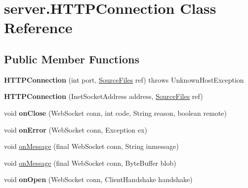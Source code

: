\hypertarget{classserver_1_1_h_t_t_p_connection}{
\section{server.HTTPConnection Class Reference}
\label{classserver_1_1_h_t_t_p_connection}
}
\subsection*{Public Member Functions}
\begin{DoxyCompactItemize}
\item 
\hypertarget{classserver_1_1_h_t_t_p_connection_a218c536b990b37f29fb8729f2c6f2f74}{
{\bfseries HTTPConnection} (int port, \hyperlink{interfaceserver_1_1_source_files}{SourceFiles} ref)  throws UnknownHostException 	}
\label{classserver_1_1_h_t_t_p_connection_a218c536b990b37f29fb8729f2c6f2f74}

\item 
\hypertarget{classserver_1_1_h_t_t_p_connection_aa08e0cdb7f3e69715c414b64aafb7af7}{
{\bfseries HTTPConnection} (InetSocketAddress address, \hyperlink{interfaceserver_1_1_source_files}{SourceFiles} ref)}
\label{classserver_1_1_h_t_t_p_connection_aa08e0cdb7f3e69715c414b64aafb7af7}

\item 
\hypertarget{classserver_1_1_h_t_t_p_connection_a80529e03e86c57a169485f96ecf68c5d}{
void {\bfseries onClose} (WebSocket conn, int code, String reason, boolean remote)}
\label{classserver_1_1_h_t_t_p_connection_a80529e03e86c57a169485f96ecf68c5d}

\item 
\hypertarget{classserver_1_1_h_t_t_p_connection_a699cc6eb5d0a1dc647effe6e9b1b13b2}{
void {\bfseries onError} (WebSocket conn, Exception ex)}
\label{classserver_1_1_h_t_t_p_connection_a699cc6eb5d0a1dc647effe6e9b1b13b2}

\item 
void \hyperlink{classserver_1_1_h_t_t_p_connection_a5ac455ab0f398241c6eb43a321652d5c}{onMessage} (final WebSocket conn, String inmessage)
\item 
void \hyperlink{classserver_1_1_h_t_t_p_connection_a0b2a63779c960e53a0f97967f0ac0662}{onMessage} (final WebSocket conn, ByteBuffer blob)
\item 
\hypertarget{classserver_1_1_h_t_t_p_connection_a68c699873f67716b86e168fd824c15ed}{
void {\bfseries onOpen} (WebSocket conn, ClientHandshake handshake)}
\label{classserver_1_1_h_t_t_p_connection_a68c699873f67716b86e168fd824c15ed}

\end{DoxyCompactItemize}
